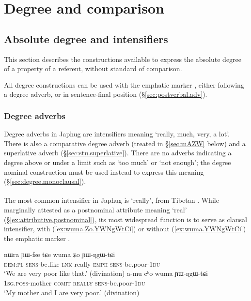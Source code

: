 \chapter{Degree and comparison} \label{chap:degree}
 
\section{Absolute degree and intensifiers} \label{sec:absolute.degree}
This section describes the constructions available to express the absolute degree of a property of a referent, without standard of comparison.

All degree constructions can be used with the emphatic marker , either following a degree adverb, or in sentence-final position (§\ref{sec:postverbal.adv}).

\subsection{Degree adverbs} \label{sec:degree.adverbs}
Degree adverbs in Japhug are intensifiers meaning `really, much, very, a lot'. There is also a comparative degree adverb  (treated in §\ref{sec:mAZW} below) and a superlative adverb  (§\ref{sec:stu.superlative}). There are no adverbs indicating a degree above or under a limit such as `too much' or `not enough'; the degree nominal construction must be used instead to express this meaning (§\ref{sec:degree.monoclausal}).


\subsubsection{} \label{sec:wuma}
The most common intensifier in Japhug is  `really', from Tibetan . While marginally attested as a postnominal attribute meaning `real' (§\ref{ex:attributive.postnominal}), its most widespread function is to serve as clausal intensifier, with (\ref{ex:wuma.Zo.YWNgWtCi}) or without (\ref{ex:wuma.YWNgWtCi}) the emphatic marker .

\begin{exe}
\ex 
\begin{xlist}
\ex \label{ex:wuma.Zo.YWNgWtCi}
\gll nɯra ɲɯ-fse tɕe wuma ʑo ɲɯ-ŋgɯ-tɕi \\
\textsc{dem}:\textsc{pl} \textsc{sens}-be.like \textsc{lnk} really \textsc{emph}  \textsc{sens}-be.poor-\textsc{1du} \\
\glt `We are very poor like that.' (divination)
\ex \label{ex:wuma.YWNgWtCi}
\gll  a-mu cʰo wuma ɲɯ-ŋgɯ-tɕi  \\
\textsc{1sg}.\textsc{poss}-mother \textsc{comit} \textsc{really} \textsc{sens}-be.poor-\textsc{1du} \\
\glt `My mother and I are very poor.' (divination)
\end{xlist}
\end{exe}

